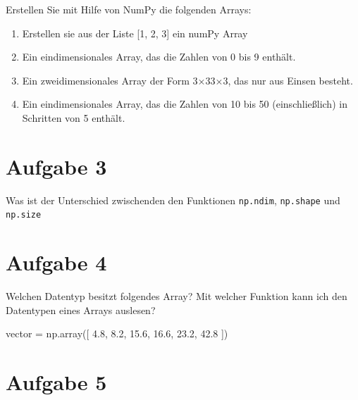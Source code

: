 \documentclass[
  letterpaper,
  DIV=11,
  numbers=noendperiod]{scrreprt}
\newenvironment{Shaded}{\begin{snugshade}}{\end{snugshade}}
\newcommand{\FloatTok}[1]{\textcolor[rgb]{0.68,0.00,0.00}{#1}}
\newcommand{\NormalTok}[1]{\textcolor[rgb]{0.00,0.23,0.31}{#1}}
\newcommand{\OperatorTok}[1]{\textcolor[rgb]{0.37,0.37,0.37}{#1}}
\providecommand{\tightlist}{%
  \setlength{\itemsep}{0pt}\setlength{\parskip}{0pt}}\usepackage{longtable,booktabs,array}
\begin{document}

Erstellen Sie mit Hilfe von NumPy die folgenden Arrays:

\begin{enumerate}
\def\labelenumi{\arabic{enumi}.}
\tightlist
\item
  Erstellen sie aus der Liste {[}1, 2, 3{]} ein numPy Array
\item
  Ein eindimensionales Array, das die Zahlen von 0 bis 9 enthält.
\item
  Ein zweidimensionales Array der Form 3×33×3, das nur aus Einsen
  besteht.
\item
  Ein eindimensionales Array, das die Zahlen von 10 bis 50
  (einschließlich) in Schritten von 5 enthält.
\end{enumerate}

\section*{Aufgabe 3}\label{aufgabe-3}


Was ist der Unterschied zwischenden den Funktionen \texttt{np.ndim},
\texttt{np.shape} und \texttt{np.size}

\section*{Aufgabe 4}\label{aufgabe-4}


Welchen Datentyp besitzt folgendes Array? Mit welcher Funktion kann ich
den Datentypen eines Arrays auslesen?

\begin{Shaded}
\begin{Highlighting}[]
\NormalTok{vector }\OperatorTok{=}\NormalTok{ np.array([ }\FloatTok{4.8}\NormalTok{,  }\FloatTok{8.2}\NormalTok{, }\FloatTok{15.6}\NormalTok{, }\FloatTok{16.6}\NormalTok{, }\FloatTok{23.2}\NormalTok{, }\FloatTok{42.8}\NormalTok{ ])}
\end{Highlighting}
\end{Shaded}

\section*{Aufgabe 5}\label{aufgabe-5}
\end{document}
